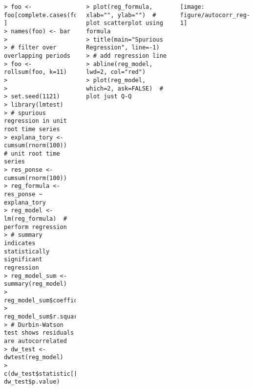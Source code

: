 \documentclass[10pt]{beamer}\usepackage[]{graphicx}\usepackage[]{color}
\makeatletter
\newenvironment{kframe}{%
 \def\at@end@of@kframe{}%
 \ifinner\ifhmode%
  \def\at@end@of@kframe{\end{minipage}}%
  \begin{minipage}{\columnwidth}%
 \fi\fi%
 \def\FrameCommand##1{\hskip\@totalleftmargin \hskip-\fboxsep
 \colorbox{shadecolor}{##1}\hskip-\fboxsep
     \hskip-\linewidth \hskip-\@totalleftmargin \hskip\columnwidth}%
 \MakeFramed {\advance\hsize-\width
   \@totalleftmargin\z@ \linewidth\hsize
   \@setminipage}}%
 {\par\unskip\endMakeFramed%
 \at@end@of@kframe}
\newenvironment{knitrout}{}{} %
\makeatother
\begin{document}
\begin{frame}[fragile,t]{\subsecname}
\begin{block}{}
\begin{columns}[T]
\begin{knitrout}
\begin{kframe}
\begin{verbatim}
> foo <- foo[complete.cases(foo), ]
> names(foo) <- bar
> 
> # filter over overlapping periods
> foo <- rollsum(foo, k=11)
> 
> 
> set.seed(1121)
> library(lmtest)
> # spurious regression in unit root time series
> explana_tory <- cumsum(rnorm(100))  # unit root time series
> res_ponse <- cumsum(rnorm(100))
> reg_formula <- res_ponse ~ explana_tory
> reg_model <- lm(reg_formula)  # perform regression
> # summary indicates statistically significant regression
> reg_model_sum <- summary(reg_model)
> reg_model_sum$coefficients
> reg_model_sum$r.squared
> # Durbin-Watson test shows residuals are autocorrelated
> dw_test <- dwtest(reg_model)
> c(dw_test$statistic[[1]], dw_test$p.value)
\end{verbatim}
\end{kframe}
\end{knitrout}
      \vspace{-2em}
\begin{knitrout}\scriptsize
{}\color{fgcolor}\begin{kframe}
\begin{verbatim}
> plot(reg_formula, xlab="", ylab="")  # plot scatterplot using formula
> title(main="Spurious Regression", line=-1)
> # add regression line
> abline(reg_model, lwd=2, col="red")
> plot(reg_model, which=2, ask=FALSE)  # plot just Q-Q
\end{verbatim}
\end{kframe}
\end{knitrout}
      \vspace{-1em}
      \hspace*{-1em}
      \texttt{[image: figure/autocorr\_reg-1]}
  \end{columns}
\end{block}

\end{frame}


\end{document}
